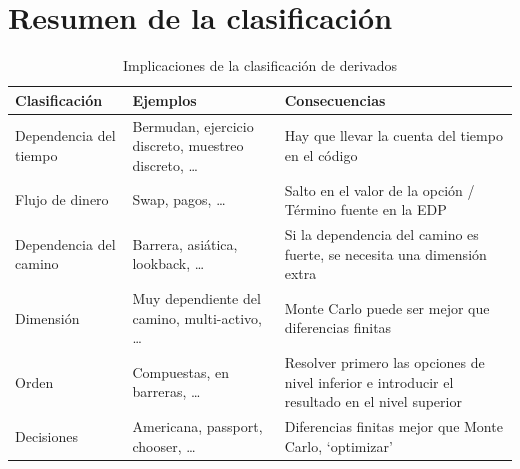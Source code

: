 \section{Resumen de la clasificación}
\begin{table}[H]
    \centering
    \begin{tabularx}{\linewidth}{|X|X|X|}
        \hline
        \textbf{Clasificación} & \textbf{Ejemplos} & \textbf{Consecuencias} \\
        \hline
        Dependencia del tiempo & Bermudan, ejercicio discreto, muestreo discreto, \ldots & Hay que llevar la cuenta del tiempo en el código \\
        \hline
        Flujo de dinero & Swap, pagos, \ldots & Salto en el valor de la opción / Término fuente en la EDP \\
        \hline
        Dependencia del camino & Barrera, asiática, lookback, \ldots & Si la dependencia del camino es fuerte, se necesita una dimensión extra \\
        \hline
        Dimensión & Muy dependiente del camino, multi-activo, \ldots & Monte Carlo puede ser mejor que diferencias finitas \\
        \hline
        Orden & Compuestas, en barreras, \ldots & Resolver primero las opciones de nivel inferior e introducir el resultado en el nivel superior \\
        \hline
        Decisiones & Americana, passport, chooser, \ldots & Diferencias finitas mejor que Monte Carlo, ‘optimizar’ \\
        \hline
    \end{tabularx}
    \caption{Implicaciones de la clasificación de derivados}
\end{table}


